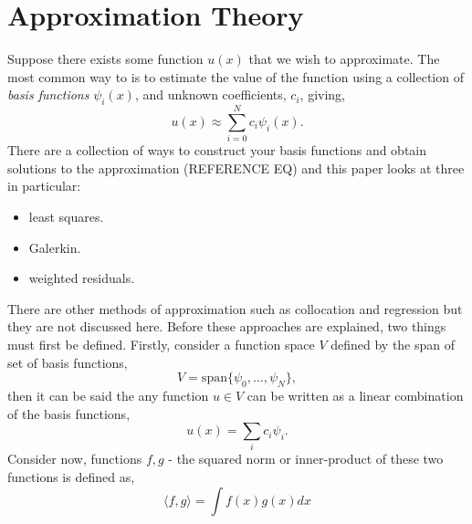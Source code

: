 \section{Approximation Theory}

Suppose there exists some function $u(x)$ that we wish to approximate. The most common way to is to estimate the value of the function using a collection of \textit{basis functions} $\psi_i(x)$, and unknown coefficients, $c_i$, giving,
\begin{equation}
	u(x) \approx \sum_{i=0}^N c_i\psi_i(x).
\end{equation}
There are a collection of ways to construct your basis functions and obtain solutions to the approximation (REFERENCE EQ) and this paper looks at three in particular:
\begin{itemize}
	\item least squares.
	\item Galerkin.
	\item weighted residuals.
\end{itemize}
There are other methods of approximation such as collocation and regression but they are not discussed here. Before these approaches are explained, two things must first be defined. Firstly, consider a function space $V$ defined by the span of set of basis functions,
\begin{equation}
	V = \text{span}\{\psi_0,\dots,\psi_N\},
\end{equation}
then it can be said the any function $u\in V$ can be written as a linear combination of the basis functions,
	\begin{equation}
		u(x) = \sum_i c_i \psi_i. 
	\end{equation}
Consider now, functions $f,g$ - the squared norm or inner-product of these two functions is defined as,
\begin{equation}
	\langle f,g\rangle = \int f(x)g(x)dx
\end{equation}
